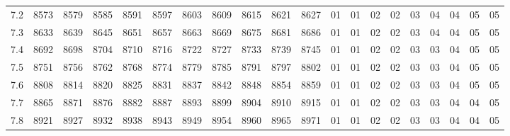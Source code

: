 \documentclass[12pt,UTF8,fontset=none]{ctexbook}
\begin{document}
\begin{appendix}
\begin{longtable}{|c| c c c c c | c c c c c| c c c c c c c c c|}
\scriptsize 7.2 & \scriptsize 8573 & \scriptsize 8579 & \scriptsize 8585 & \scriptsize 8591 & \scriptsize 8597 & \scriptsize 8603 & \scriptsize 8609 & \scriptsize 8615 & \scriptsize 8621 & \scriptsize 8627 & \scriptsize 01 & \scriptsize 01 & \scriptsize 02 & \scriptsize 02 & \scriptsize 03 & \scriptsize 04 & \scriptsize 04 & \scriptsize 05 & \scriptsize 05 \\
\scriptsize 7.3 & \scriptsize 8633 & \scriptsize 8639 & \scriptsize 8645 & \scriptsize 8651 & \scriptsize 8657 & \scriptsize 8663 & \scriptsize 8669 & \scriptsize 8675 & \scriptsize 8681 & \scriptsize 8686 & \scriptsize 01 & \scriptsize 01 & \scriptsize 02 & \scriptsize 02 & \scriptsize 03 & \scriptsize 04 & \scriptsize 04 & \scriptsize 05 & \scriptsize 05 \\
\scriptsize 7.4 & \scriptsize 8692 & \scriptsize 8698 & \scriptsize 8704 & \scriptsize 8710 & \scriptsize 8716 & \scriptsize 8722 & \scriptsize 8727 & \scriptsize 8733 & \scriptsize 8739 & \scriptsize 8745 & \scriptsize 01 & \scriptsize 01 & \scriptsize 02 & \scriptsize 02 & \scriptsize 03 & \scriptsize 03 & \scriptsize 04 & \scriptsize 05 & \scriptsize 05 \\
\scriptsize 7.5 & \scriptsize 8751 & \scriptsize 8756 & \scriptsize 8762 & \scriptsize 8768 & \scriptsize 8774 & \scriptsize 8779 & \scriptsize 8785 & \scriptsize 8791 & \scriptsize 8797 & \scriptsize 8802 & \scriptsize 01 & \scriptsize 01 & \scriptsize 02 & \scriptsize 02 & \scriptsize 03 & \scriptsize 03 & \scriptsize 04 & \scriptsize 05 & \scriptsize 05 \\
\scriptsize 7.6 & \scriptsize 8808 & \scriptsize 8814 & \scriptsize 8820 & \scriptsize 8825 & \scriptsize 8831 & \scriptsize 8837 & \scriptsize 8842 & \scriptsize 8848 & \scriptsize 8854 & \scriptsize 8859 & \scriptsize 01 & \scriptsize 01 & \scriptsize 02 & \scriptsize 02 & \scriptsize 03 & \scriptsize 03 & \scriptsize 04 & \scriptsize 05 & \scriptsize 05 \\
\scriptsize 7.7 & \scriptsize 8865 & \scriptsize 8871 & \scriptsize 8876 & \scriptsize 8882 & \scriptsize 8887 & \scriptsize 8893 & \scriptsize 8899 & \scriptsize 8904 & \scriptsize 8910 & \scriptsize 8915 & \scriptsize 01 & \scriptsize 01 & \scriptsize 02 & \scriptsize 02 & \scriptsize 03 & \scriptsize 03 & \scriptsize 04 & \scriptsize 04 & \scriptsize 05 \\
\scriptsize 7.8 & \scriptsize 8921 & \scriptsize 8927 & \scriptsize 8932 & \scriptsize 8938 & \scriptsize 8943 & \scriptsize 8949 & \scriptsize 8954 & \scriptsize 8960 & \scriptsize 8965 & \scriptsize 8971 & \scriptsize 01 & \scriptsize 01 & \scriptsize 02 & \scriptsize 02 & \scriptsize 03 & \scriptsize 03 & \scriptsize 04 & \scriptsize 04 & \scriptsize 05 \\

\end{longtable}
\end{appendix}
\end{document}

